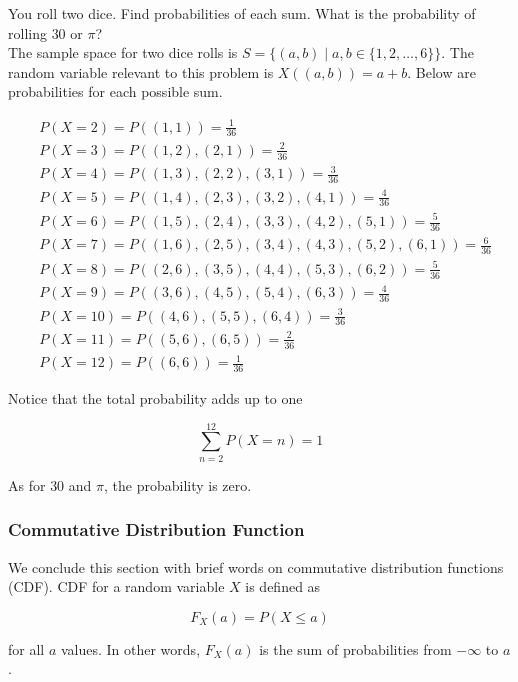 \documentclass[12pt, a4paper]{article}
\newcounter{exa}
\begin{document}
\begin{texample}
You roll two dice. Find probabilities of each sum. What is the probability of rolling $30$ or $\pi$? \\

The sample space for two dice rolls is $S=\{(a,b) \mid a,b \in \{1, 2, \dots, 6\}\}$. The random variable relevant to this problem is $X((a,b))=a+b$. Below are probabilities for each possible sum.

\begin{align*}
&P(X = 2) = P((1, 1)) = \frac{1}{36} \\
&P(X = 3) = P((1, 2), (2, 1)) = \frac{2}{36} \\
&P(X = 4) = P((1, 3), (2, 2), (3, 1)) = \frac{3}{36} \\
&P(X = 5) = P((1, 4), (2, 3), (3, 2), (4, 1)) = \frac{4}{36} \\
&P(X = 6) = P((1, 5), (2, 4), (3, 3), (4, 2), (5, 1)) = \frac{5}{36} \\
&P(X = 7) = P((1, 6), (2, 5), (3, 4), (4, 3), (5, 2), (6, 1)) = \frac{6}{36} \\
&P(X = 8) = P((2, 6), (3, 5), (4, 4), (5, 3), (6, 2)) = \frac{5}{36} \\
&P(X = 9) = P((3, 6), (4, 5), (5, 4), (6, 3)) = \frac{4}{36} \\
&P(X = 10) = P((4, 6), (5, 5), (6, 4)) = \frac{3}{36} \\
&P(X = 11) = P((5, 6), (6, 5)) = \frac{2}{36} \\
&P(X = 12) = P((6, 6)) = \frac{1}{36}
\end{align*}

Notice that the total probability adds up to one

$$\sum_{n=2}^{12} P(X=n)=1$$

As for $30$ and $\pi$, the probability is zero.
\end{texample}

\subsubsection{Commutative Distribution Function}

We conclude this section with brief words on commutative distribution functions (CDF). CDF for a random variable $X$ is defined as

$$F_X (a)=P(X\le a)$$

for all $a$ values. In other words, $F_X(a)$ is the sum of probabilities from $-\infty$ to $a$. \\
\end{document}
